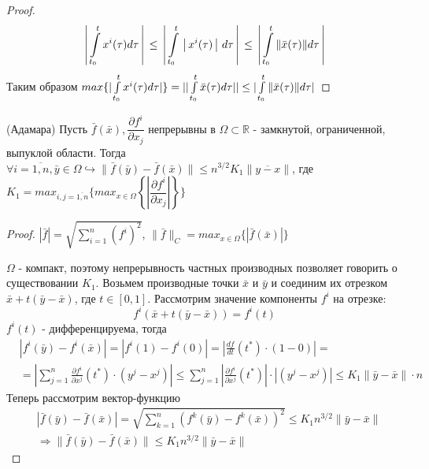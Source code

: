 	\begin{proof}
		\begin{equation*}
			\left\arrowvert \int\limits_{t_0}^t x^i(\tau)d\tau \right\arrowvert \le\left\arrowvert \int\limits_{t_0}^t \left\arrowvert x^i(\tau) \right\arrowvert d\tau\right\arrowvert \le \left\arrowvert \int\limits_{t_0}^t \Arrowvert \bar{x}(\tau)\Arrowvert d\tau \right\arrowvert
		\end{equation*}
		Таким образом $max\{|\int\limits_{t_0}^t x^i(\tau)d\tau|\} = || \int\limits_{t_0}^t \bar{x}(\tau)d\tau || \le \arrowvert \int\limits_{t_0}^t \Arrowvert \bar{x}(\tau)\Arrowvert d\tau \arrowvert$
	\end{proof}

	\begin{lemma} (Адамара)
		Пусть $\bar{f}(\bar{x}), \dfrac{\partial f^i}{\partial x_j}$ непрерывны в $\Omega \subset \mathbb{R} $ - замкнутой, ограниченной, выпуклой области. Тогда $\forall i = \overline{1,n}, \bar{y} \in \Omega \hookrightarrow \| \bar{f}(\bar{y}) - \bar{f}(\bar{x}) \| \le n^{3/2}K_1\|\overline{y-x}\|$, где $K_1 = max_{i,j=\overline{1,n}}\{max_{x\in\Omega}\left\{\left|\dfrac{\partial f^i}{\partial x_j}\right|\right\} \}$
	\end{lemma}

	\begin{proof}
		
		$|\bar{f}| = \sqrt{\sum\limits_{i=1}^n (f^i)^2}$, $\|\bar{f}\|_C = max_{x\in\Omega}\{|\bar{f}(\bar{x})|\}$
		
		$\Omega$ - компакт, поэтому непрерывность частных производных позволяет говорить о существовании $K_1$. Возьмем производные точки $\bar{x}$ и $\bar{y}$ и соединим их отрезком $\bar{x} + t(\bar{y} - \bar{x})$, где $t\in[0, 1]$. Рассмотрим значение компоненты $f^i$ на отрезке:
		\[
			f^i(\bar{x} + t(\bar{y} - \bar{x})) = f^i(t)
		\]
		$f^i(t)$ - дифференцируема, тогда
		\begin{align*}
			&|f^i(\bar{y}) - f^i(\bar{x})| = |f^i(1) - f^i(0)| = \left| \frac{df}{dt}(t^*)\cdot(1-0)\right| = \\
			&= \left|\sum\limits_{j=1}^n\frac{\partial f^i}{\partial x^j}(t^*)\cdot(y^j - x^j)\right| \le \sum\limits_{j=1}^n\left|\frac{\partial f^i}{\partial x^j}(t^*)\right|\cdot\left|(y^j - x^j)\right| \le K_1\|\bar{y}-\bar{x}\|\cdot n
		\end{align*}
		Теперь рассмотрим вектор-функцию
		\begin{align*}
			&|\bar{f}(\bar{y}) - \bar{f}(\bar{x})| = \sqrt{\sum\limits_{k=1}^n (f^k(\bar{y}) - f^k(\bar{x}))^2} \le K_1n^{3/2}\|\bar{y}-\bar{x}\| \\
			&\Rightarrow \|\bar{f}(\bar{y}) - \bar{f}(\bar{x})\| \le K_1n^{3/2}\|\bar{y}-\bar{x}\|
		\end{align*}
	\end{proof}
	
